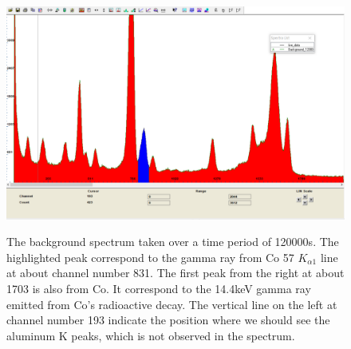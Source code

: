 \documentclass[12pt]{article}
\begin{document}
\begin{figure}[H]
\begin{center}
\includegraphics[width=12cm]{background}
\label{Fig. 5}
\caption{The background spectrum taken over a time period of 120000s. The highlighted peak correspond to the gamma ray from Co 57 $K_{\alpha 1}$ line at about channel number 831. The first peak from the right at about 1703 is also from Co. It correspond to the 14.4keV gamma ray emitted from Co's radioactive decay. The vertical line on the left at channel number 193 indicate the position where we should see the aluminum K peaks, which is not observed in the spectrum.}
\end{center}
\end{figure}
\end{document}
